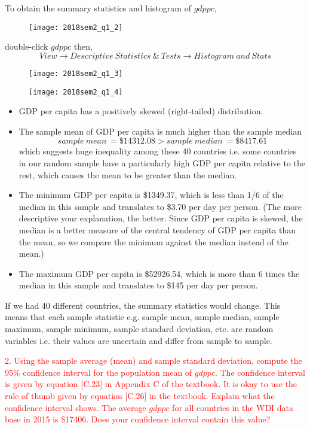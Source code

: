 \documentclass[12pt]{report}
\begin{document}
\noindent To obtain the summary statistics and histogram of $gdppc$,
\begin{figure}[H]
	\centerline{\texttt{[image: 2018sem2\_q1\_2]}}
\end{figure}
\noindent double-click $gdppc$ then, $$View \to Descriptive\ Statistics\ \&\ Tests \to Histogram\ and\ Stats$$
\begin{figure}[H]
	\centerline{\texttt{[image: 2018sem2\_q1\_3]}}
\end{figure}
\begin{figure}[H]
	\centerline{\texttt{[image: 2018sem2\_q1\_4]}}
\end{figure}
\begin{itemize}
	\item GDP per capita has a positively skewed (right-tailed) distribution.
	\item The sample mean of GDP per capita is much higher than the sample median $$sample\ mean\ = \$14312.08 > sample\ median\ = \$8417.61$$ which suggests huge inequality among these 40 countries i.e. some countries in our random sample have a particularly high GDP per capita relative to the rest, which causes the mean to be greater than the median.
	\item The minimum GDP per capita is \$1349.37, which is less than 1/6 of the median in this sample and translates to \$3.70 per day per person. (The more descriptive your explanation, the better. Since GDP per capita is skewed, the median is a better measure of the central tendency of GDP per capita than the mean, so we compare the minimum against the median instead of the mean.)
	\item The maximum GDP per capita is \$52926.54, which is more than 6 times the median in this sample and translates to \$145 per day per person.
\end{itemize}
\noindent If we had 40 different countries, the summary statistics would change. This means that each sample statistic e.g. sample mean, sample median, sample maximum, sample minimum, sample standard deviation, etc. are random variables i.e. their values are uncertain and differ from sample to sample.

\newpage
\noindent \textcolor{red}{2. Using the sample average (mean) and sample standard deviation, compute the 95\% confidence interval for the population mean of $gdppc$. The confidence interval is given by equation [C.23] in Appendix C of the textbook. It is okay to use the rule of thumb given by equation [C.26] in the textbook. Explain what the confidence interval shows. The average $gdppc$ for all countries in the WDI data base in 2015 is \$17406. Does your confidence interval contain this value?}
\end{document}
